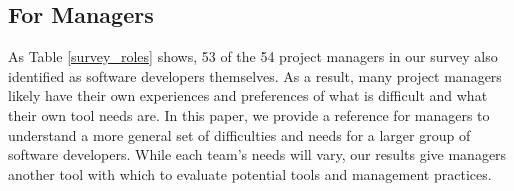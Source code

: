 \subsection{For Managers}
As Table \ref{survey_roles} shows, 53 of the 54 project managers in our survey also identified as software developers themselves. As a result, many project managers likely have their own experiences and preferences of what is difficult and what their own tool needs are. In this paper, we provide a reference for managers to understand a more general set of difficulties and needs for a larger group of software developers. While each team's needs will vary, our results give managers another tool with which to evaluate potential tools and management practices.